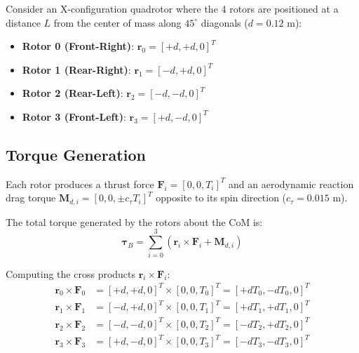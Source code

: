 \documentclass[11pt,a4paper]{article}
\begin{document}
Consider an X-configuration quadrotor where the 4 rotors are positioned at a distance $L$ from the center of mass along $45^\circ$ diagonals ($d = 0.12\text{ m}$):
\begin{itemize}
    \item \textbf{Rotor 0 (Front-Right)}: $\mathbf{r}_0 = [+d, +d, 0]^T$
    \item \textbf{Rotor 1 (Rear-Right)}: $\mathbf{r}_1 = [-d, +d, 0]^T$
    \item \textbf{Rotor 2 (Rear-Left)}: $\mathbf{r}_2 = [-d, -d, 0]^T$
    \item \textbf{Rotor 3 (Front-Left)}: $\mathbf{r}_3 = [+d, -d, 0]^T$
\end{itemize}

\subsection{Torque Generation}
Each rotor produces a thrust force $\mathbf{F}_i = [0, 0, T_i]^T$ and an aerodynamic reaction drag torque $\mathbf{M}_{d,i} = [0, 0, \pm c_\tau T_i]^T$ opposite to its spin direction ($c_\tau = 0.015\text{ m}$).

The total torque generated by the rotors about the CoM is:
\begin{equation}
\boldsymbol{\tau}_B = \sum_{i=0}^3 \left( \mathbf{r}_i \times \mathbf{F}_i + \mathbf{M}_{d,i} \right)
\end{equation}

Computing the cross products $\mathbf{r}_i \times \mathbf{F}_i$:
\begin{align}
\mathbf{r}_0 \times \mathbf{F}_0 &= [+d, +d, 0]^T \times [0, 0, T_0]^T = [+d T_0, -d T_0, 0]^T \\
\mathbf{r}_1 \times \mathbf{F}_1 &= [-d, +d, 0]^T \times [0, 0, T_1]^T = [+d T_1, +d T_1, 0]^T \\
\mathbf{r}_2 \times \mathbf{F}_2 &= [-d, -d, 0]^T \times [0, 0, T_2]^T = [-d T_2, +d T_2, 0]^T \\
\mathbf{r}_3 \times \mathbf{F}_3 &= [+d, -d, 0]^T \times [0, 0, T_3]^T = [-d T_3, -d T_3, 0]^T
\end{align}
\end{document}
